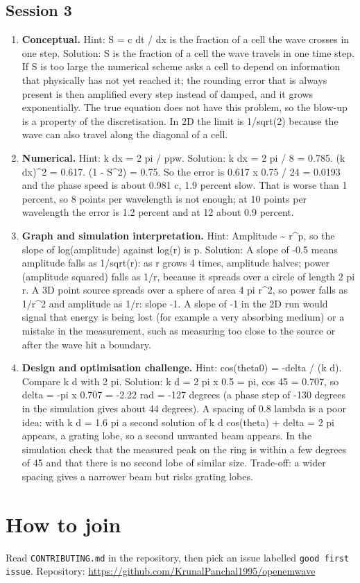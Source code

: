 \documentclass[11pt,a4paper]{article}
\begin{document}
\subsection*{Session 3}
\begin{enumerate}[nosep]
\item \textbf{Conceptual.} Hint: S = c dt / dx is the fraction of a cell the wave crosses in one step. Solution: S is the fraction of a cell the wave travels in one time step. If S is too large the numerical scheme asks a cell to depend on information that physically has not yet reached it; the rounding error that is always present is then amplified every step instead of damped, and it grows exponentially. The true equation does not have this problem, so the blow-up is a property of the discretisation. In 2D the limit is 1/sqrt(2) because the wave can also travel along the diagonal of a cell.
\item \textbf{Numerical.} Hint: k dx = 2 pi / ppw. Solution: k dx = 2 pi / 8 = 0.785. (k dx)\textasciicircum{}2 = 0.617. (1 - S\textasciicircum{}2) = 0.75. So the error is 0.617 x 0.75 / 24 = 0.0193 and the phase speed is about 0.981 c, 1.9 percent slow. That is worse than 1 percent, so 8 points per wavelength is not enough; at 10 points per wavelength the error is 1.2 percent and at 12 about 0.9 percent.
\item \textbf{Graph and simulation interpretation.} Hint: Amplitude \textasciitilde{} r\textasciicircum{}p, so the slope of log(amplitude) against log(r) is p. Solution: A slope of -0.5 means amplitude falls as 1/sqrt(r): as r grows 4 times, amplitude halves; power (amplitude squared) falls as 1/r, because it spreads over a circle of length 2 pi r. A 3D point source spreads over a sphere of area 4 pi r\textasciicircum{}2, so power falls as 1/r\textasciicircum{}2 and amplitude as 1/r: slope -1. A slope of -1 in the 2D run would signal that energy is being lost (for example a very absorbing medium) or a mistake in the measurement, such as measuring too close to the source or after the wave hit a boundary.
\item \textbf{Design and optimisation challenge.} Hint: cos(theta0) = -delta / (k d). Compare k d with 2 pi. Solution: k d = 2 pi x 0.5 = pi, cos 45 = 0.707, so delta = -pi x 0.707 = -2.22 rad = -127 degrees (a phase step of -130 degrees in the simulation gives about 44 degrees). A spacing of 0.8 lambda is a poor idea: with k d = 1.6 pi a second solution of k d cos(theta) + delta = 2 pi appears, a grating lobe, so a second unwanted beam appears. In the simulation check that the measured peak on the ring is within a few degrees of 45 and that there is no second lobe of similar size. Trade-off: a wider spacing gives a narrower beam but risks grating lobes.
\end{enumerate}

\section{How to join}
Read \texttt{CONTRIBUTING.md} in the repository, then pick an issue labelled \texttt{good first issue}. Repository: \url{https://github.com/KrunalPanchal1995/openemwave}
\end{document}
